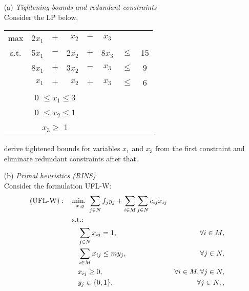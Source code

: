

\begin{itemize}
	\item [(a)] \textit{Tightening bounds and redundant constraints}\\
	
	Consider the LP below,
	\begin{table}[H]
		\centering
		\begin{tabular}{crcrcccc}
			max         &  2$x_1$  & $+$ &   $x_2$  & $-$ &   $x_3$  \vspace{3pt}\\
			s.t.        &  5$x_1$  & $-$ &  2$x_2$  & $+$ &  8$x_3$  & $\leq$ &  15  \vspace{3pt}\\
			&  8$x_1$  & $+$ &  3$x_2$  & $-$ &   $x_3$  & $\leq$ &   9  \vspace{3pt}\\
			&   $x_1$  & $+$ &   $x_2$  & $+$ &   $x_3$  & $\leq$ &   6  \vspace{3pt}\\
			& \multicolumn{3}{c}{0 $\leq x_1 \leq 3$} \vspace{3pt}\\  
			& \multicolumn{3}{c}{0 $\leq x_2 \leq 1$} \vspace{3pt}\\  
			& \multicolumn{3}{c}{$x_3 \geq$ 1},   
		\end{tabular}
	\end{table}

	derive tightened bounds for variables $x_1$ and $x_3$ from the first constraint and eliminate redundant constraints after that. \vspace{10pt}

	\item [(b)] \textit{Primal heuristics (RINS)}\\
	
	Consider the formulation UFL-W:
	\begin{align}
	 \text{(UFL-W)} : \quad &\mathop{\text{min.~}}_{x,y} \sum_{j\in N} f_jy_j + \sum_{i\in M}\sum_{j\in N} c_{ij}x_{ij} \label{IP:1}\\
	       &\mathop{\text{s.t.:~}}\nonumber \\
	       &\quad \sum_{j\in N}x_{ij} = 1, &\forall i \in M,\label{IP:2}\\
	       &\quad \sum_{i\in M}x_{ij} \leq my_j, &\forall  j \in N,\label{IP:3}\\
	       &\quad x_{ij} \geq 0, &\forall i \in M, \forall j \in N,\label{IP:4}\\
	       &\quad y_j \in \{0,1\}, &\forall j\in N,\label{IP:5},
	\end{align}
	

\end{itemize}

